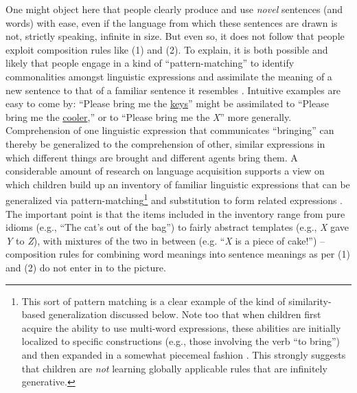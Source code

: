 One might object here that people clearly produce and use \textit{novel} sentences (and words) with ease, even if the language from which these sentences are drawn is not, strictly speaking, infinite in size. But even so, it does not follow that people exploit composition rules like (1) and (2). To explain, it is both possible and likely that people engage in a kind of ``pattern-matching'' to identify commonalities amongst linguistic expressions and assimilate the meaning of a new sentence to that of a familiar sentence it resembles \citep{Tomasello:2003}. Intuitive examples are easy to come by: ``Please bring me the \underline{keys}'' might be assimilated to ``Please bring me the \underline{cooler},'' or to ``Please bring me the \textit{X}'' more generally. Comprehension of one linguistic expression that communicates ``bringing'' can thereby be generalized to the comprehension of other, similar expressions in which different things are brought and different agents bring them. A considerable amount of research on language acquisition supports a view on which children build up an inventory of familiar linguistic expressions that can be generalized via pattern-matching\footnote{This sort of pattern matching is a clear example of the kind of similarity-based generalization discussed below. Note too that when children first acquire the ability to use multi-word expressions, these abilities are initially localized to specific constructions (e.g., those involving the verb ``to bring'') and then expanded in a somewhat piecemeal fashion \citep{Tomasello:2003,Tomasello:2005}. This strongly suggests that children are \textit{not} learning globally applicable rules that are infinitely generative.} and substitution to form related expressions \citep{Tomasello:2003}. The important point is that the items included in the inventory range from pure idioms (e.g., ``The cat's out of the bag'') to fairly abstract templates (e.g., \textit{X} gave \textit{Y} to \textit{Z}), with mixtures of the two in between (e.g. ``\textit{X} is a piece of cake!'') -- composition rules for combining word meanings into sentence meanings as per (1) and (2) do not enter in to the picture. 


